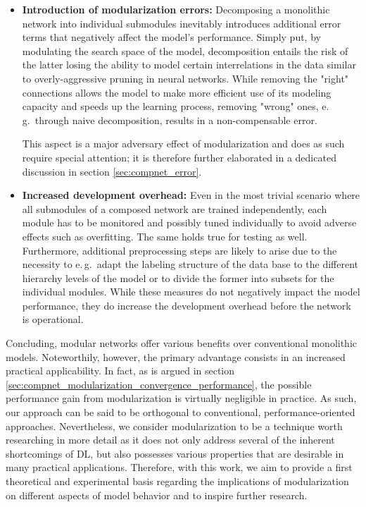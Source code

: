 \begin{itemize}
    \item \textbf{Introduction of modularization errors:} Decomposing a monolithic network into individual submodules inevitably introduces additional error terms that negatively affect the model's performance. Simply put, by modulating the search space of the model, decomposition entails the risk of the latter losing the ability to model certain interrelations in the data similar to overly-aggressive pruning in neural networks. While removing the "right" connections allows the model to make more efficient use of its modeling capacity and speeds up the learning process, removing "wrong" ones, e.\,g.\ through naive decomposition, results in a non-compensable error.
    
    This aspect is a major adversary effect of modularization and does as such require special attention; it is therefore further elaborated in a dedicated discussion in section \ref{sec:compnet_error}.
    \item \textbf{Increased development overhead:} Even in the most trivial scenario where all submodules of a composed network are trained independently, each module has to be monitored and possibly tuned individually to avoid adverse effects such as overfitting. The same holds true for testing as well. Furthermore, additional preprocessing steps are likely to arise due to the necessity to e.\,g.\ adapt the labeling structure of the data base to the different hierarchy levels of the model or to divide the former into subsets for the individual modules. While these measures do not negatively impact the model performance, they do increase the development overhead before the network is operational.
\end{itemize}

Concluding, modular networks offer various benefits over conventional monolithic models. Noteworthily, however, the primary advantage consists in an increased practical applicability. In fact, as is argued in section \ref{sec:compnet_modularization_convergence_performance}, the possible performance gain from modularization is virtually negligible in practice. As such, our approach can be said to be orthogonal to conventional, performance-oriented approaches. Nevertheless, we consider modularization to be a technique worth researching in more detail as it does not only address several of the inherent shortcomings of DL, but also possesses various properties that are desirable in many practical applications. Therefore, with this work, we aim to provide a first theoretical and experimental basis regarding the implications of modularization on different aspects of model behavior and to inspire further research.

